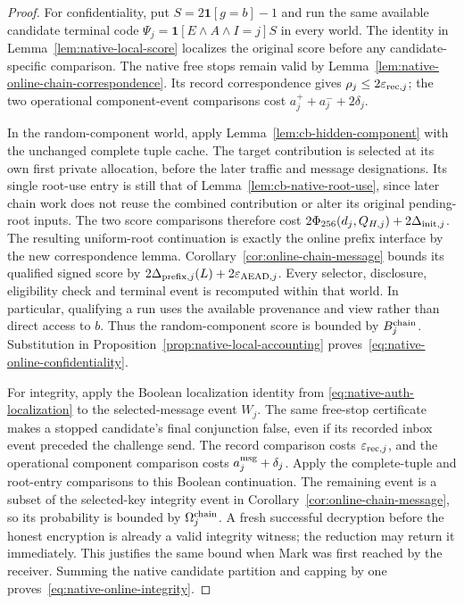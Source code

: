 \documentclass[pdflatex]{sn-jnl}
\theoremstyle{thmstyleone}
\theoremstyle{thmstylethree}
\theoremstyle{thmstyletwo}
\begin{document}
\begin{proof}
For confidentiality, put
$S=2\mathbf1[g=b]-1$ and run the same available candidate terminal
code $\Psi_j=\mathbf1[E\wedge A\wedge I=j]S$ in every world.
The identity in Lemma~\ref{lem:native-local-score} localizes the
original score before any candidate-specific comparison. The native
free stops remain valid by
Lemma~\ref{lem:native-online-chain-correspondence}. Its record
correspondence gives $\rho_j\le2\varepsilon_{{\rm rec},j}$;
the two operational component-event comparisons cost
$a_j^++a_j^-+2\delta_j$.

In the random-component world, apply
Lemma~\ref{lem:cb-hidden-component} with the unchanged complete tuple
cache. The target contribution is selected at its own first private
allocation, before the later traffic and message designations. Its
single root-use entry is still that of
Lemma~\ref{lem:cb-native-root-use}, since later chain work does not
reuse the combined contribution or alter its original pending-root
inputs. The two score comparisons therefore cost
$2\Phi_{256}(d_j,Q_{H,j})+2\Delta_{{\rm init},j}$.
The resulting uniform-root continuation is exactly the online prefix
interface by the new correspondence lemma.
Corollary~\ref{cor:online-chain-message} bounds its qualified signed
score by $2\Delta_{{\rm prefix},j}(L)+2\varepsilon_{{\rm AEAD},j}$.
Every selector, disclosure, eligibility check and terminal event is
recomputed within that world. In particular, qualifying a run uses
the available provenance and view rather than direct access to $b$.
Thus the random-component score is bounded by $B_j^{\rm chain}$.
Substitution in Proposition~\ref{prop:native-local-accounting}
proves~\eqref{eq:native-online-confidentiality}.

For integrity, apply the Boolean localization identity from
\eqref{eq:native-auth-localization} to the selected-message event
$W_j$. The same free-stop certificate makes a stopped candidate's
final conjunction false, even if its recorded inbox event preceded
the challenge send. The record comparison costs
$\varepsilon_{{\rm rec},j}$, and the operational component comparison
costs $a_j^{\rm msg}+\delta_j$. Apply the complete-tuple and root-entry
comparisons to this Boolean continuation. The remaining event is a
subset of the selected-key integrity event in
Corollary~\ref{cor:online-chain-message}, so its probability is bounded
by $\Omega_j^{\rm chain}$. A fresh successful decryption before the
honest encryption is already a valid integrity witness; the reduction
may return it immediately. This justifies the same bound when Mark
was first reached by the receiver. Summing the native candidate
partition and capping by one proves~\eqref{eq:native-online-integrity}.


\end{proof}
\end{document}
